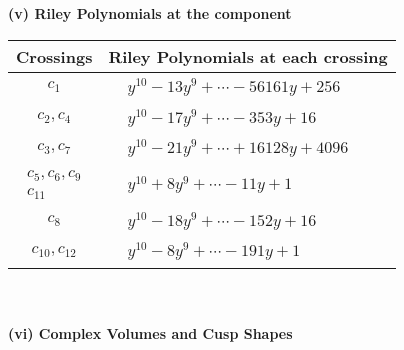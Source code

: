 \documentclass[1p]{elsarticle_modified}
\theoremstyle{definition}
\begin{document}
\newpage\renewcommand{\arraystretch}{1}
\flushleft \textbf{(v) Riley Polynomials at the component}\newline \\
\begin{tabular}{m{50pt}|m{274pt}}
Crossings & \hspace{64pt}Riley Polynomials at each crossing \\
\hline $$\begin{aligned}c_{1}\end{aligned}$$&$\begin{aligned}
&y^{10}-13 y^9+\cdots-56161 y+256
\end{aligned}$\\
\hline $$\begin{aligned}c_{2},c_{4}\end{aligned}$$&$\begin{aligned}
&y^{10}-17 y^9+\cdots-353 y+16
\end{aligned}$\\
\hline $$\begin{aligned}c_{3},c_{7}\end{aligned}$$&$\begin{aligned}
&y^{10}-21 y^9+\cdots+16128 y+4096
\end{aligned}$\\
\hline $$\begin{aligned}c_{5},c_{6},c_{9}\\c_{11}\end{aligned}$$&$\begin{aligned}
&y^{10}+8 y^9+\cdots-11 y+1
\end{aligned}$\\
\hline $$\begin{aligned}c_{8}\end{aligned}$$&$\begin{aligned}
&y^{10}-18 y^9+\cdots-152 y+16
\end{aligned}$\\
\hline $$\begin{aligned}c_{10},c_{12}\end{aligned}$$&$\begin{aligned}
&y^{10}-8 y^9+\cdots-191 y+1
\end{aligned}$\\
\hline
\end{tabular}\\~\\
\newpage\flushleft \textbf{(vi) Complex Volumes and Cusp Shapes}
\end{document}
